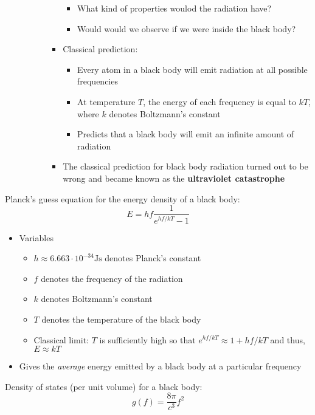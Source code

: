 \documentclass[a4paper]{article}
\begin{document}
\begin{itemize}
\begin{itemize}
\begin{enumerate}
\begin{itemize}
                                    \begin{itemize}
                                        \item What kind of properties woulod the radiation have?
                                        \item Would would we observe if we were inside the black body?
                                    \end{itemize}
                                \item Classical prediction: 
                                    \begin{itemize}
                                        \item Every atom in a black body will emit radiation at all possible frequencies
                                        \item At temperature $T$, the energy of each frequency is equal to $kT$, where $k$ denotes Boltzmann's constant
                                        \item Predicts that a black body will emit an infinite amount of radiation
                                    \end{itemize}
                                 \item The classical prediction for black body radiation turned out to be wrong and became known as the \textbf{ultraviolet catastrophe}
                                
                            \end{itemize}
                    \end{enumerate}
            \end{itemize}
    \end{itemize}
Planck's guess equation for the energy density of a black body:
    \begin{equation}
        E = hf\frac{1}{e^{hf/kT}-1}
    \end{equation}
    \begin{itemize}
        \item Variables
            \begin{itemize}
                \item $h \approx 6.663 \cdot 10^{-34} \mathrm{Js}$ denotes Planck's constant
                \item $f$ denotes the frequency of the radiation 
                \item $k$ denotes Boltzmann's constant
                \item $T$ denotes the temperature of the black body
                \item Classical limit: $T$ is sufficiently high so that $e^{hf/kT} \approx 1 + hf/kT$ and thus, $E \approx kT$
            \end{itemize}
        \item Gives the \textit{average} energy emitted by a black body at a particular frequency
    \end{itemize}
Density of states (per unit volume) for a black body:
    \begin{equation}
        g(f) = \frac{8\pi}{c^3}f^2
    \end{equation}
\end{document}
